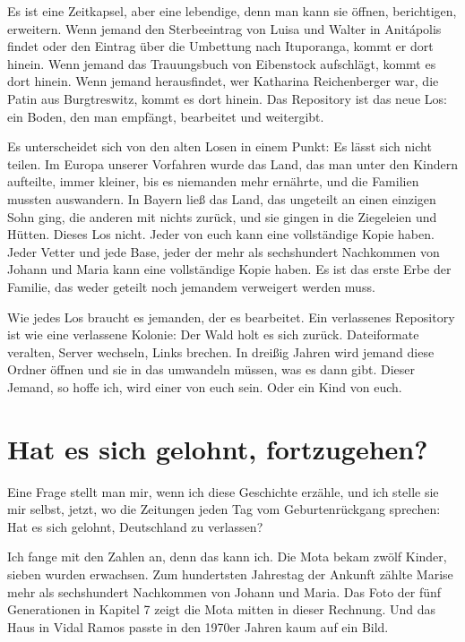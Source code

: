 \documentclass[
  ngerman,
  11pt,
  openany]{book}
\begin{document}
Es ist eine Zeitkapsel, aber eine lebendige, denn man kann sie öffnen,
berichtigen, erweitern. Wenn jemand den Sterbeeintrag von Luisa und
Walter in Anitápolis findet oder den Eintrag über die Umbettung nach
Ituporanga, kommt er dort hinein. Wenn jemand das Trauungsbuch von
Eibenstock aufschlägt, kommt es dort hinein. Wenn jemand herausfindet,
wer Katharina Reichenberger war, die Patin aus Burgtreswitz, kommt es
dort hinein. Das Repository ist das neue Los: ein Boden, den man
empfängt, bearbeitet und weitergibt.

Es unterscheidet sich von den alten Losen in einem Punkt: Es lässt sich
nicht teilen. Im Europa unserer Vorfahren wurde das Land, das man unter
den Kindern aufteilte, immer kleiner, bis es niemanden mehr ernährte,
und die Familien mussten auswandern. In Bayern ließ das Land, das
ungeteilt an einen einzigen Sohn ging, die anderen mit nichts zurück,
und sie gingen in die Ziegeleien und Hütten. Dieses Los nicht. Jeder von
euch kann eine vollständige Kopie haben. Jeder Vetter und jede Base,
jeder der mehr als sechshundert Nachkommen von Johann und Maria kann
eine vollständige Kopie haben. Es ist das erste Erbe der Familie, das
weder geteilt noch jemandem verweigert werden muss.

Wie jedes Los braucht es jemanden, der es bearbeitet. Ein verlassenes
Repository ist wie eine verlassene Kolonie: Der Wald holt es sich
zurück. Dateiformate veralten, Server wechseln, Links brechen. In
dreißig Jahren wird jemand diese Ordner öffnen und sie in das umwandeln
müssen, was es dann gibt. Dieser Jemand, so hoffe ich, wird einer von
euch sein. Oder ein Kind von euch.

\section{Hat es sich gelohnt,
fortzugehen?}\label{hat-es-sich-gelohnt-fortzugehen}

Eine Frage stellt man mir, wenn ich diese Geschichte erzähle, und ich
stelle sie mir selbst, jetzt, wo die Zeitungen jeden Tag vom
Geburtenrückgang sprechen: Hat es sich gelohnt, Deutschland zu
verlassen?

Ich fange mit den Zahlen an, denn das kann ich. Die Mota bekam zwölf
Kinder, sieben wurden erwachsen. Zum hundertsten Jahrestag der Ankunft
zählte Marise mehr als sechshundert Nachkommen von Johann und Maria. Das
Foto der fünf Generationen in Kapitel 7 zeigt die Mota mitten in dieser
Rechnung. Und das Haus in Vidal Ramos passte in den 1970er Jahren kaum
auf ein Bild.
\end{document}
